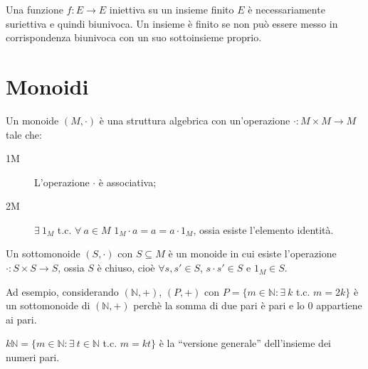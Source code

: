 Una funzione $f : E \to E $ iniettiva su un insieme finito $E$ \`e necessariamente suriettiva e quindi biunivoca. Un insieme \`e finito se non pu\`o essere messo in corrispondenza biunivoca con un suo sottoinsieme proprio.






\section{Monoidi}

Un monoide $(M, \cdot)$ \`e una struttura algebrica con un'operazione $\cdot : M \times M \to M$ tale che:
\begin{description}
    \item[1M] L'operazione $\cdot$ \`e associativa;
    \item[2M] $\exists \ 1_M $ t.c. $ \forall \ a \in M$ $ 1_M \cdot a = a = a \cdot 1_M$, ossia esiste l'elemento identit\`a. 
\end{description}

Un sottomonoide $(S, \cdot)$ con $S \subseteq M$ \`e un monoide in cui esiste l'operazione $\cdot : S \times S \to S$, ossia $S$ \`e chiuso, cio\`e $\forall s, s' \in S $, $s \cdot s' \in S$ e $1_M \in S$.

Ad esempio, considerando $(\mathbb{N}, +)$, $(P, +)$ con $P = \{ m \in \mathbb{N} : \exists \ k $ t.c. $m = 2k \}$ \`e un sottomonoide di $(\mathbb{N},+)$ perch\`e la somma di due pari \`e pari e lo 0 appartiene ai pari.

$k \mathbb{N} = \{ m \in \mathbb{N} : \exists \ t \in \mathbb{N} $ t.c. $ m = k t\}$ \`e la ``versione generale'' dell'insieme dei numeri pari.

